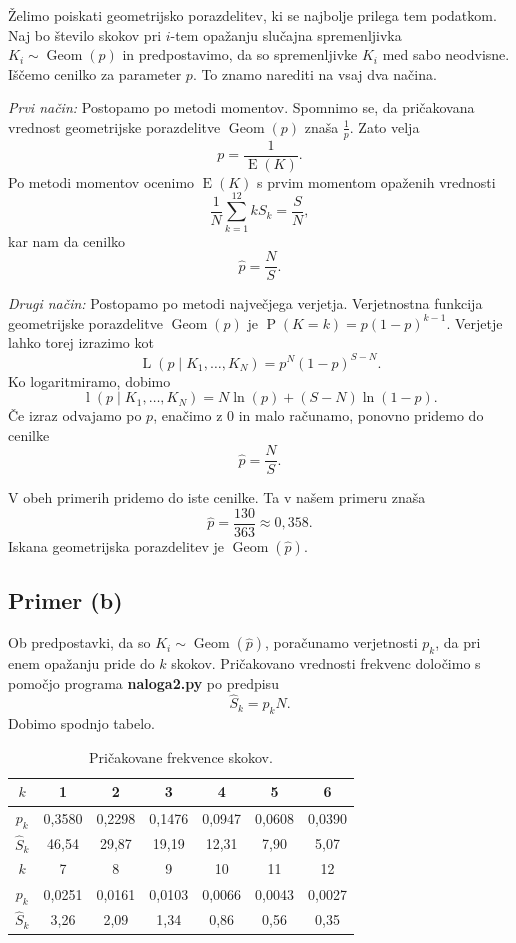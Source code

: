 \documentclass[a4paper,11pt]{article}
\DeclareMathOperator{\E}{E}
\DeclareMathOperator{\PP}{P}
\DeclareMathOperator{\Geom}{Geom}
\DeclareMathOperator{\Lver}{L}
\DeclareMathOperator{\lver}{l}
\begin{document}
Želimo poiskati geometrijsko porazdelitev, ki se najbolje prilega tem podatkom. 
Naj bo število skokov pri $i$-tem opažanju slučajna spremenljivka $K_i \sim \Geom(p)$
in predpostavimo, da so spremenljivke $K_i$ med sabo neodvisne.
Iščemo cenilko za parameter $p$. To znamo narediti na vsaj dva načina.

\emph{Prvi način:} Postopamo po metodi momentov. 
Spomnimo se, da pričakovana vrednost geometrijske porazdelitve $\Geom(p)$ znaša $\frac{1}{p}$.
Zato velja
\[p = \frac{1}{\E(K)}.\]
Po metodi momentov ocenimo $\E(K)$ s prvim momentom opaženih vrednosti 
\[\frac{1}{N} \sum_{k=1}^{12} k S_k = \frac{S}{N},\]
kar nam da cenilko
\[\hat{p} = \frac{N}{S}.\]

\emph{Drugi način:} Postopamo po metodi največjega verjetja.
Verjetnostna funkcija geometrijske porazdelitve $\Geom(p)$ je $\PP(K=k) = p(1-p)^{k-1}$.
Verjetje lahko torej izrazimo kot 
\[\Lver(p \mid K_1, \ldots, K_N) = p^N (1-p)^{S - N}.\]
Ko logaritmiramo, dobimo 
\[\lver(p \mid K_1, \ldots, K_N) = N \ln(p) + (S-N) \ln(1-p).\]
Če izraz odvajamo po $p$, enačimo z $0$ in malo računamo, ponovno pridemo do cenilke
\[\hat{p} = \frac{N}{S}.\]

V obeh primerih pridemo do iste cenilke.
Ta v našem primeru znaša 
\[\hat{p} = \frac{130}{363} \approx 0,358.\]
Iskana geometrijska porazdelitev je $\Geom(\hat{p})$.

\subsection*{Primer (b)}

Ob predpostavki, da so $K_i \sim \Geom(\hat{p})$, poračunamo verjetnosti $p_k$, da pri enem opažanju pride do $k$ skokov.
Pričakovano vrednosti frekvenc določimo s pomočjo programa \textbf{naloga2.py} po predpisu
\[\hat{S}_k = p_k N.\]
Dobimo spodnjo tabelo.
\begin{table}[H]
    \centering
    \begin{tabular}{|c|c|c|c|c|c|c|}
    \hline
    $k$ & 1 & 2 & 3 & 4 & 5 & 6 \\ \hline
    $p_k$ & 0,3580 & 0,2298 & 0,1476 & 0,0947 & 0,0608 & 0,0390  \\ \hline
    $\hat{S}_k$ & 46,54 & 29,87 & 19,19 & 12,31 & 7,90 & 5,07 \\ \hline
    $k$ & 7 & 8 & 9 & 10 & 11 & 12 \\ \hline
    $p_k$ & 0,0251 & 0,0161 & 0,0103 & 0,0066 & 0,0043 & 0,0027 \\ \hline
    $\hat{S}_k$ & 3,26 & 2,09 & 1,34 & 0,86 & 0,56 & 0,35 \\ \hline
\end{tabular}
\caption{Pričakovane frekvence skokov.}
\label{PricakovaneFreq}
\end{table}
\end{document}
